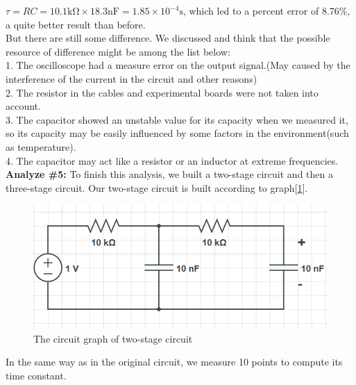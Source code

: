 $\tau = RC = 10.1\mathrm{k\Omega} \times 18.3 \mathrm{nF} = 1.85\times10^{-4}\mathrm{s}$, which led to a percent error of 8.76\%, a quite better result than before.\\
\phantom{ } But there are still some difference. We discussed and think that the possible resource of difference might be among the list below:\\
1. The oscilloscope had a measure error on the output signal.(May caused by the interference of the current in the circuit and other reasons)\\
2. The resistor in the cables and experimental boards were not taken into account.\\
3. The capacitor showed an unstable value for its capacity when we measured it, so its capacity may be easily influenced by some factors in the environment(such as temperature).\\
4. The capacitor may act like a resistor or an inductor at extreme frequencies.\\
\newline
\textbf{Analyze \#5:} \newline
\phantom{ } To finish this analysis, we built a two-stage circuit and then a three-stage circuit. Our two-stage circuit is built according to graph[\ref{fig:2.3}].\\
\begin{figure}[!htbp]
	\centering %
	\includegraphics[width=\linewidth]{images/2_3.PNG} %
	\caption{The circuit graph of two-stage circuit} %
	\label{fig:2.3} %
\end{figure}
\phantom{ } In the same way as in the original circuit, we measure 10 points to compute its time constant.
